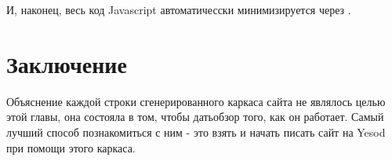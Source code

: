 И, наконец, весь код Javascript автоматичесски минимизируется через .

\section{Заключение}

Объяснение каждой строки сгенерированного каркаса сайта не являлось целью этой главы, она состояла в том, чтобы датьобзор того, как он работает. Самый лучший способ познакомиться с ним - это взять и начать писать сайт на Yesod при помощи этого каркаса.


